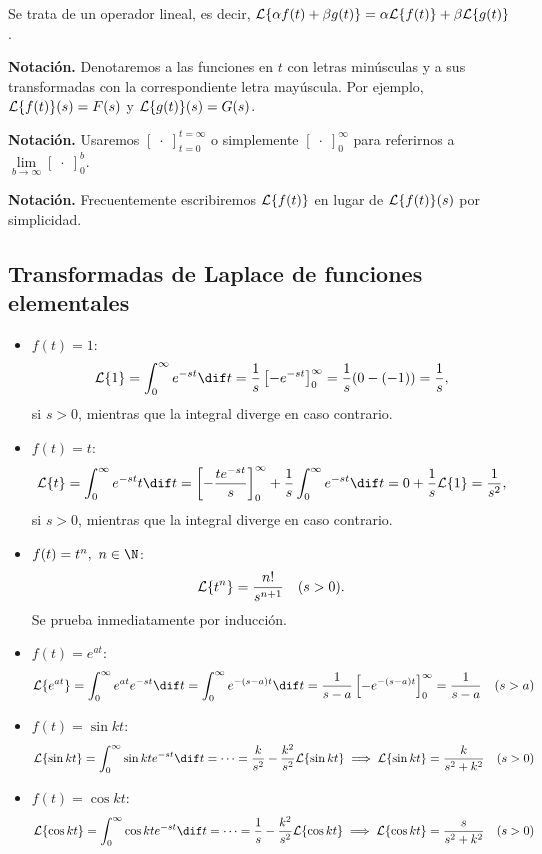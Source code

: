 \documentclass[../main.tex]{subfiles}
\begin{document}
\begin{remark}
  Se trata de un operador lineal, es decir, \(\mathcal{L}\{\alpha f(t) + \beta g(t)\} =
  \alpha \mathcal{L}\{f(t)\} + \beta \mathcal{L}\{g(t)\}\).
\end{remark}

\textbf{Notación.} Denotaremos a las funciones en \(t\) con letras minúsculas y
a sus transformadas con la correspondiente letra mayúscula. Por
ejemplo, \(\mathcal{L}\{f(t)\}(s) = F(s)\) y \(\mathcal{L}\{g(t)\}(s) = G(s)\).

\textbf{Notación.} Usaremos \([\;\cdot\;]_{t=0}^{t=\infty}\) o simplemente
\([\;\cdot\;]_0^\infty\) para referirnos a \(\lim \limits_{b \to \infty} [\;\cdot\;]_0^b\).

\textbf{Notación.} Frecuentemente escribiremos \(\mathcal{L}\{f(t)\}\) en lugar de
\(\mathcal{L}\{f(t)\}(s)\) por simplicidad.

\subsection{Transformadas de Laplace de funciones elementales}

\begin{itemize}
\item \(f(t) = 1\):
  \[\L\{1\} = \int_0^\infty e^{-st} \dif t = \frac{1}{s}
    \left[-e^{-st}\right]_0^\infty = \frac{1}{s}(0-(-1)) =
    \frac{1}{s},\]
  si \(s > 0\), mientras que la integral diverge en caso contrario.
\item \(f(t) = t\):
  \[\L\{t\} = \int_0^\infty e^{-st}t \dif t =
    \left[-\frac{te^{-st}}{s}\right]_0^\infty + \frac{1}{s} \int_0^\infty
    e^{-st} \dif t = 0 + \frac{1}{s} \L\{1\} = \frac{1}{s^2},\]
  si \(s > 0\), mientras que la integral diverge en caso contrario.
\item \(f(t) = t^n,\ n \in \N\):
  \[\mathcal{L}\{t^n\} = \frac{n!}{s^{n+1}} \quad (s>0).\]
  Se prueba inmediatamente por inducción.
\item \(f(t) = e^{at}\):
  \[\L\{e^{at}\} = \int_0^\infty e^{at}e^{-st} \dif t = \int_0^\infty
    e^{-(s-a)t} \dif t = \frac{1}{s-a}\left[-e^{-(s-a)t}\right]_0^\infty =
    \frac{1}{s-a} \quad (s>a)\]
\item \(f(t) = \sin kt\):
  \[\L\{\sin kt\} = \int_0^\infty \sin kt e^{-st} \dif t = \cdots = \frac{k}{s^2} -
    \frac{k^2}{s^2} \L\{\sin kt\} \implies \L\{\sin kt\} = \frac{k}{s^2+k^2}
    \quad (s>0)\]
\item \(f(t) = \cos kt\):
  \[\L\{\cos kt\} = \int_0^\infty \cos kt e^{-st} \dif t = \cdots = \frac{1}{s} -
    \frac{k^2}{s^2}\L\{\cos kt\} \implies  \L\{\cos kt\} = \frac{s}{s^2+k^2}
    \quad (s>0)\]
\end{itemize}
\end{document}
